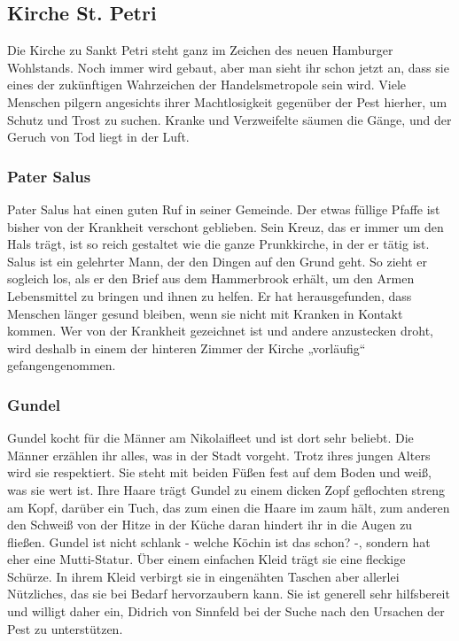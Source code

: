 \subsection{Kirche St. Petri}

Die Kirche zu Sankt Petri steht ganz im Zeichen des neuen Hamburger Wohlstands. Noch immer wird gebaut, aber man sieht ihr schon jetzt an, dass sie eines der zukünftigen Wahrzeichen der Handelsmetropole sein wird. Viele Menschen pilgern angesichts ihrer Machtlosigkeit gegenüber der Pest hierher, um Schutz und Trost zu suchen. Kranke und Verzweifelte säumen die Gänge, und der Geruch von Tod liegt in der Luft.


\subsubsection*{Pater Salus}
\label{Salus}

Pater Salus hat einen guten Ruf in seiner Gemeinde. Der etwas füllige Pfaffe ist bisher von der Krankheit verschont geblieben. Sein Kreuz, das er immer um den Hals trägt, ist so reich gestaltet wie die ganze Prunkkirche, in der er tätig ist. Salus ist ein gelehrter Mann, der den Dingen auf den Grund geht. So zieht er sogleich los, als er den Brief aus dem Hammerbrook erhält, um den Armen Lebensmittel zu bringen und ihnen zu helfen. Er hat herausgefunden, dass Menschen länger gesund bleiben, wenn sie nicht mit Kranken in Kontakt kommen. Wer von der Krankheit gezeichnet ist und andere anzustecken droht, wird deshalb in einem der hinteren Zimmer der Kirche „vorläufig“ gefangengenommen.

\subsubsection*{Gundel}
\label{Gundel}

Gundel kocht für die Männer am Nikolaifleet und ist dort sehr beliebt. Die Männer erzählen ihr alles, was in der Stadt vorgeht. Trotz ihres jungen Alters wird sie respektiert. Sie steht mit beiden Füßen fest auf dem Boden und weiß, was sie wert ist. Ihre Haare trägt Gundel zu einem dicken Zopf geflochten streng am Kopf, darüber ein Tuch, das zum einen die Haare im zaum hält, zum anderen den Schweiß von der Hitze in der Küche daran hindert ihr in die Augen zu fließen. Gundel ist nicht schlank - welche Köchin ist das schon? -, sondern hat eher eine Mutti-Statur. Über einem einfachen Kleid trägt sie eine fleckige Schürze. In ihrem Kleid verbirgt sie in eingenähten Taschen aber allerlei Nützliches, das sie bei Bedarf hervorzaubern kann. Sie ist generell sehr hilfsbereit und willigt daher ein, Didrich von Sinnfeld bei der Suche nach den Ursachen der Pest zu unterstützen.

